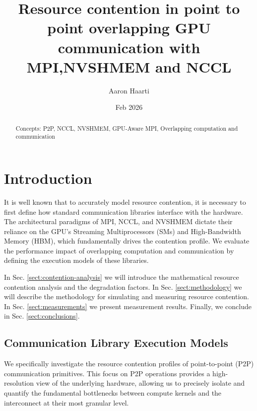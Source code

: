 \documentclass[twocolumn, secnumarabic, amssymb, nobibnotes, aps, prd, amsmath, nofootinbib]{revtex4-2}
\begin{document}
\title{Resource contention in point to point overlapping GPU communication with MPI,NVSHMEM and NCCL}
\author{Aaron Haarti}


\date{Feb 2026}

\begin{abstract}
Concepts: P2P, NCCL, NVSHMEM, GPU-Aware MPI, Overlapping computation and communication
\end{abstract}

\maketitle

\section{Introduction}\label{sect:introduction}

It is well known that to accurately model resource contention, it is necessary to first define how standard communication libraries interface with the hardware. The architectural paradigms of MPI, NCCL, and NVSHMEM dictate their reliance on the GPU's Streaming Multiprocessors (SMs) and High-Bandwidth Memory (HBM), which fundamentally drives the contention profile. We evaluate the performance impact of overlapping computation and communication by defining the execution models of these libraries.

In Sec. \ref{sect:contention-analysis} we will introduce the mathematical resource contention analysis and the degradation factors. In Sec. \ref{sect:methodology} we will describe the methodology for simulating and measuring resource contention. In Sec. \ref{sect:measurements} we present measurement results. Finally, we conclude in Sec. \ref{sect:conclusions}.

\subsection{Communication Library Execution Models}

We specifically investigate the resource contention profiles of point-to-point (P2P) communication primitives. This focus on P2P operations provides a high-resolution view of the underlying hardware, allowing us to precisely isolate and quantify the fundamental bottlenecks between compute kernels and the interconnect at their most granular level.
\end{document}
